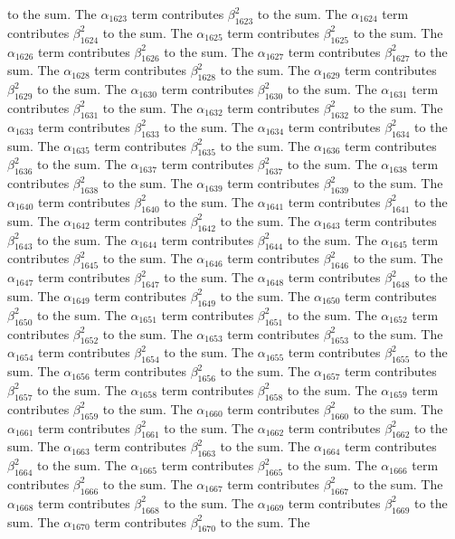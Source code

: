 \begin{lemma}
to the sum. The $\alpha_{1623}$ term contributes $\beta_{1623}^{2}$ to the sum. The $\alpha_{1624}$ term contributes $\beta_{1624}^{2}$ to the sum. The $\alpha_{1625}$ term contributes $\beta_{1625}^{2}$ to the sum. The $\alpha_{1626}$ term contributes $\beta_{1626}^{2}$ to the sum. The $\alpha_{1627}$ term contributes $\beta_{1627}^{2}$ to the sum. The $\alpha_{1628}$ term contributes $\beta_{1628}^{2}$ to the sum. The $\alpha_{1629}$ term contributes $\beta_{1629}^{2}$ to the sum. The $\alpha_{1630}$ term contributes $\beta_{1630}^{2}$ to the sum. The $\alpha_{1631}$ term contributes $\beta_{1631}^{2}$ to the sum. The $\alpha_{1632}$ term contributes $\beta_{1632}^{2}$ to the sum. The $\alpha_{1633}$ term contributes $\beta_{1633}^{2}$ to the sum. The $\alpha_{1634}$ term contributes $\beta_{1634}^{2}$ to the sum. The $\alpha_{1635}$ term contributes $\beta_{1635}^{2}$ to the sum. The $\alpha_{1636}$ term contributes $\beta_{1636}^{2}$ to the sum. The $\alpha_{1637}$ term contributes $\beta_{1637}^{2}$ to the sum. The $\alpha_{1638}$ term contributes $\beta_{1638}^{2}$ to the sum. The $\alpha_{1639}$ term contributes $\beta_{1639}^{2}$ to the sum. The $\alpha_{1640}$ term contributes $\beta_{1640}^{2}$ to the sum. The $\alpha_{1641}$ term contributes $\beta_{1641}^{2}$ to the sum. The $\alpha_{1642}$ term contributes $\beta_{1642}^{2}$ to the sum. The $\alpha_{1643}$ term contributes $\beta_{1643}^{2}$ to the sum. The $\alpha_{1644}$ term contributes $\beta_{1644}^{2}$ to the sum. The $\alpha_{1645}$ term contributes $\beta_{1645}^{2}$ to the sum. The $\alpha_{1646}$ term contributes $\beta_{1646}^{2}$ to the sum. The $\alpha_{1647}$ term contributes $\beta_{1647}^{2}$ to the sum. The $\alpha_{1648}$ term contributes $\beta_{1648}^{2}$ to the sum. The $\alpha_{1649}$ term contributes $\beta_{1649}^{2}$ to the sum. The $\alpha_{1650}$ term contributes $\beta_{1650}^{2}$ to the sum. The $\alpha_{1651}$ term contributes $\beta_{1651}^{2}$ to the sum. The $\alpha_{1652}$ term contributes $\beta_{1652}^{2}$ to the sum. The $\alpha_{1653}$ term contributes $\beta_{1653}^{2}$ to the sum. The $\alpha_{1654}$ term contributes $\beta_{1654}^{2}$ to the sum. The $\alpha_{1655}$ term contributes $\beta_{1655}^{2}$ to the sum. The $\alpha_{1656}$ term contributes $\beta_{1656}^{2}$ to the sum. The $\alpha_{1657}$ term contributes $\beta_{1657}^{2}$ to the sum. The $\alpha_{1658}$ term contributes $\beta_{1658}^{2}$ to the sum. The $\alpha_{1659}$ term contributes $\beta_{1659}^{2}$ to the sum. The $\alpha_{1660}$ term contributes $\beta_{1660}^{2}$ to the sum. The $\alpha_{1661}$ term contributes $\beta_{1661}^{2}$ to the sum. The $\alpha_{1662}$ term contributes $\beta_{1662}^{2}$ to the sum. The $\alpha_{1663}$ term contributes $\beta_{1663}^{2}$ to the sum. The $\alpha_{1664}$ term contributes $\beta_{1664}^{2}$ to the sum. The $\alpha_{1665}$ term contributes $\beta_{1665}^{2}$ to the sum. The $\alpha_{1666}$ term contributes $\beta_{1666}^{2}$ to the sum. The $\alpha_{1667}$ term contributes $\beta_{1667}^{2}$ to the sum. The $\alpha_{1668}$ term contributes $\beta_{1668}^{2}$ to the sum. The $\alpha_{1669}$ term contributes $\beta_{1669}^{2}$ to the sum. The $\alpha_{1670}$ term contributes $\beta_{1670}^{2}$ to the sum. The 
\end{lemma}
